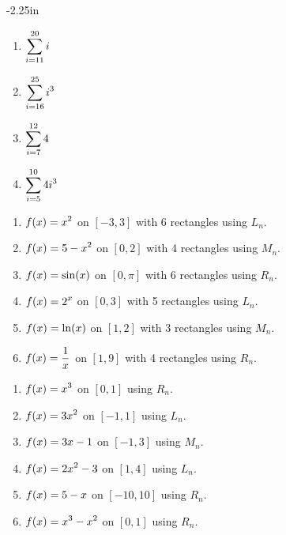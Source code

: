 \begin{adjustwidth*}{}{-2.25in}
\begin{multicols*}{2}
\bmtwo
\begin{enumerate}[1),start=22]
\item $\displaystyle \sum_{i=11}^{20} i$
\item $\displaystyle \sum_{i=16}^{25} i^3$
\item $\displaystyle \sum_{i=7}^{12} 4$
\item $\displaystyle \sum_{i=5}^{10} 4i^3$
\end{enumerate}
\emtwo

\columnbreak


\begin{enumerate}[1),start=26]
\item $\displaystyle f(x) = x^2$ on $[-3,3]$ with 6 rectangles using $L_n$.
\item $\displaystyle f(x) = 5-x^2$ on $[0,2]$ with 4 rectangles using $M_n$.
\item $\displaystyle f(x) = \sin(x)$ on $[0,\pi]$ with 6 rectangles using $R_n$.
\item $\displaystyle f(x) = 2^x$ on $[0,3]$ with 5 rectangles using $L_n$.
\item $\displaystyle f(x) = \ln(x)$ on $[1,2]$ with 3 rectangles using $M_n$.
\item $\displaystyle f(x) = \frac{1}{x}$ on $[1,9]$ with 4 rectangles using $R_n$.
\end{enumerate}


\begin{enumerate}[1),resume]
\item $\displaystyle f(x) = x^3$ on $[0,1]$ using $R_n$.
\item $\displaystyle f(x) = 3x^2$ on $[-1,1]$ using $L_n$.
\item $\displaystyle f(x) = 3x-1$ on $[-1,3]$ using $M_n$.
\item $\displaystyle f(x) = 2x^2 - 3$ on $[1,4]$ using $L_n$.
\item $\displaystyle f(x) = 5 - x$ on $[-10,10]$ using $R_n$.
\item $\displaystyle f(x) = x^3 - x^2$ on $[0,1]$ using $R_n$.


\end{enumerate}
\end{multicols*}
\end{adjustwidth*}

